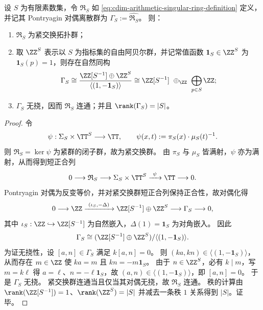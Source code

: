 \begin{theorem}[算术奇异环的对偶刻画与连通性]\label{thm:cdim-arithmetic-singular-ring-dual-connected}
设 \(S\) 为有限素数集，令 \(\mathfrak{R}_S\) 如 \eqref{eq:cdim-arithmetic-singular-ring-definition} 定义，并记其 Pontryagin 对偶离散群为
\(
\Gamma_S:=\widehat{\mathfrak{R}_S}
\)。
则：
\begin{enumerate}
  \item \(\mathfrak{R}_S\) 为紧交换拓扑群；
  \item 取 \(\ZZ^{S}\) 表示以 \(S\) 为指标集的自由阿贝尔群，并记常值函数 \(\mathbf{1}_S\in\ZZ^{S}\) 为 \(\mathbf{1}_S(p)=1\)，则存在自然同构
  \[
  \Gamma_S
  \cong
  \frac{\ZZ[S^{-1}]\oplus \ZZ^{S}}{\langle(1,-\mathbf{1}_S)\rangle}
  \cong
  \ZZ[S^{-1}]\ \oplus_{\ZZ}\ \bigoplus_{p\in S}\ZZ;
  \]
  \item \(\Gamma_S\) 无挠，因而 \(\mathfrak{R}_S\) 连通；并且 \(\rank(\Gamma_S)=|S|\)。
\end{enumerate}
\end{theorem}
\begin{proof}
令
\[
\psi:\Sigma_S\times \TT^{S}\longrightarrow \TT,
\qquad
\psi(x,t):=\pi_S(x)\cdot \mu_S(t)^{-1}.
\]
则 \(\mathfrak{R}_S=\ker\psi\) 为紧群的闭子群，故为紧交换群。
由 \(\pi_S\) 与 \(\mu_S\) 皆满射，\(\psi\) 亦为满射，从而得到短正合列
\[
0\longrightarrow \mathfrak{R}_S
\longrightarrow \Sigma_S\times \TT^{S}
\xrightarrow{\ \psi\ }
\TT
\longrightarrow 0.
\]
Pontryagin 对偶为反变等价，并对紧交换群短正合列保持正合性，故对偶化得
\[
0\longrightarrow \ZZ
\xrightarrow{\ (\iota_S,-\Delta)\ }
\ZZ[S^{-1}]\oplus \ZZ^{S}
\longrightarrow \Gamma_S
\longrightarrow 0,
\]
其中 \(\iota_S:\ZZ\hookrightarrow\ZZ[S^{-1}]\) 为自然嵌入，\(\Delta(1)=\mathbf{1}_S\) 为对角嵌入。
因此
\[
\Gamma_S\cong (\ZZ[S^{-1}]\oplus \ZZ^{S})/\langle(1,-\mathbf{1}_S)\rangle.
\]
为证无挠性，设 \([a,n]\in\Gamma_S\) 满足 \(k[a,n]=0\)。
则 \((ka,kn)\in\langle(1,-\mathbf{1}_S)\rangle\)，从而存在 \(m\in\ZZ\) 使
\(
ka=m
\)
且
\(
kn=-m\mathbf{1}_S
\)。
由于 \(n\in\ZZ^{S}\)，必有 \(k\mid m\)，写 \(m=k\ell\) 得 \(a=\ell\)、\(n=-\ell\mathbf{1}_S\)，故 \((a,n)\in\langle(1,-\mathbf{1}_S)\rangle\)，即 \([a,n]=0\)。
于是 \(\Gamma_S\) 无挠。
紧交换群连通当且仅当其对偶无挠，故 \(\mathfrak{R}_S\) 连通。
秩的计算由 \(\rank(\ZZ[S^{-1}])=1\)、\(\rank(\ZZ^{S})=|S|\) 并减去一条秩 \(1\) 关系得到 \(|S|\)。证毕。
\end{proof}






